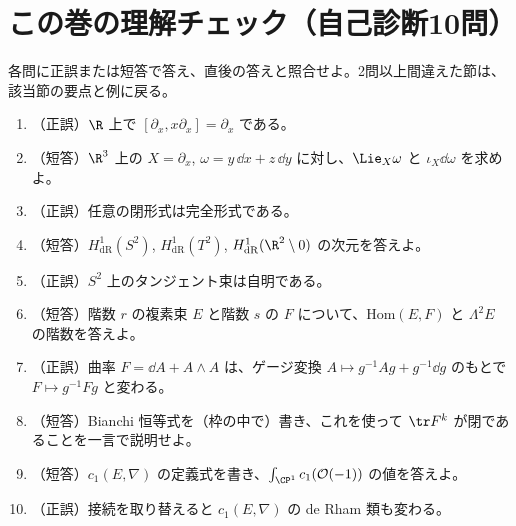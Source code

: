 
\section{この巻の理解チェック（自己診断10問）}
各問に正誤または短答で答え、直後の答えと照合せよ。2問以上間違えた節は、該当節の要点と例に戻る。

\begin{enumerate}[label=\textbf{Q\arabic*.},leftmargin=2.4em]
\item（正誤）$\R$ 上で $[\partial_x,x\partial_x]=\partial_x$ である。
\item（短答）$\R^3$ 上の $X=\partial_x$, $\omega=y\,\dd x+z\,\dd y$ に対し、$\Lie_X\omega$ と $\iota_X\dd\omega$ を求めよ。
\item（正誤）任意の閉形式は完全形式である。
\item（短答）$H^1_{\mathrm{dR}}(S^2)$, $H^1_{\mathrm{dR}}(T^2)$, $H^1_{\mathrm{dR}}(\R^2\setminus0)$ の次元を答えよ。
\item（正誤）$S^2$ 上のタンジェント束は自明である。
\item（短答）階数 $r$ の複素束 $E$ と階数 $s$ の $F$ について、$\mathrm{Hom}(E,F)$ と $\Lambda^2E$ の階数を答えよ。
\item（正誤）曲率 $F=\dd A+A\wedge A$ は、ゲージ変換 $A\mapsto g^{-1}Ag+g^{-1}\dd g$ のもとで $F\mapsto g^{-1}Fg$ と変わる。
\item（短答）Bianchi 恒等式を（枠の中で）書き、これを使って $\tr F^k$ が閉であることを一言で説明せよ。
\item（短答）$c_1(E,\nabla)$ の定義式を書き、$\int_{\CP^1}c_1(\mathcal O(-1))$ の値を答えよ。
\item（正誤）接続を取り替えると $c_1(E,\nabla)$ の de Rham 類も変わる。
\end{enumerate}

